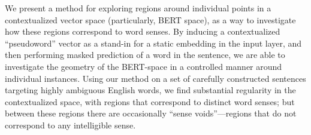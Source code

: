 We present a method for exploring regions around individual points in a contextualized vector space (particularly, BERT space), as a way to investigate how these regions correspond to word senses. By inducing a contextualized ``pseudoword'' vector as a stand-in for a static embedding in the input layer, and then performing masked prediction of a word in the sentence, we are able to investigate the geometry of the BERT-space in a controlled manner around individual instances. Using our method on a set of carefully constructed sentences targeting highly ambiguous English words, we find substantial regularity in the contextualized space, with regions that correspond to distinct word senses; but between these regions there are occasionally ``sense voids''—regions that do not correspond to any intelligible sense.
